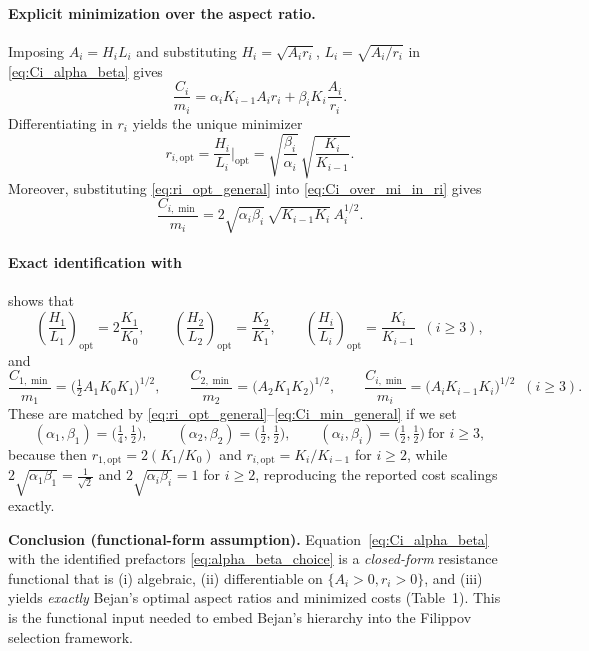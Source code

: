 \documentclass[12pt]{article}
\theoremstyle{plain}
\theoremstyle{definition}
\theoremstyle{remark}
\newcommand{\opt}{\mathrm{opt}}
\begin{document}
\paragraph{Explicit minimization over the aspect ratio.}
Imposing $A_i=H_iL_i$ and substituting $H_i=\sqrt{A_i r_i}$,
$L_i=\sqrt{A_i/r_i}$ in \eqref{eq:Ci_alpha_beta} gives
\begin{equation}
\frac{C_i}{m_i}
=
\alpha_i K_{i-1} A_i r_i
+
\beta_i K_i \frac{A_i}{r_i}.
\label{eq:Ci_over_mi_in_ri}
\end{equation}
Differentiating in $r_i$ yields the unique minimizer
\begin{equation}
r_{i,\opt}
=
\frac{H_i}{L_i}\Big|_{\opt}
=
\sqrt{\frac{\beta_i}{\alpha_i}}\,
\sqrt{\frac{K_i}{K_{i-1}}}.
\label{eq:ri_opt_general}
\end{equation}
Moreover, substituting \eqref{eq:ri_opt_general} into \eqref{eq:Ci_over_mi_in_ri}
gives
\begin{equation}
\frac{C_{i,\min}}{m_i}
=
2\sqrt{\alpha_i\beta_i}\,\sqrt{K_{i-1}K_i}\,A_i^{1/2}.
\label{eq:Ci_min_general}
\end{equation}

\paragraph{Exact identification with \cite{BejanBadescuDeVos2000ECM}} shows that 
\[
\left(\frac{H_1}{L_1}\right)_{\opt}=2\frac{K_1}{K_0},
\qquad
\left(\frac{H_2}{L_2}\right)_{\opt}=\frac{K_2}{K_1},
\qquad
\left(\frac{H_i}{L_i}\right)_{\opt}=\frac{K_i}{K_{i-1}}\;\;(i\ge 3),
\]
and
\[
\frac{C_{1,\min}}{m_1}=\Big(\tfrac12 A_1 K_0K_1\Big)^{1/2},\qquad
\frac{C_{2,\min}}{m_2}=\Big(A_2 K_1K_2\Big)^{1/2},\qquad
\frac{C_{i,\min}}{m_i}=\Big(A_i K_{i-1}K_i\Big)^{1/2}\;\;(i\ge 3).
\]
These are matched by \eqref{eq:ri_opt_general}--\eqref{eq:Ci_min_general} if we set
\begin{equation}
(\alpha_1,\beta_1)=\Big(\tfrac14,\tfrac12\Big),\qquad
(\alpha_2,\beta_2)=\Big(\tfrac12,\tfrac12\Big),\qquad
(\alpha_i,\beta_i)=\Big(\tfrac12,\tfrac12\Big)\ \text{for } i\ge 3,
\label{eq:alpha_beta_choice}
\end{equation}
because then
$r_{1,\opt}=2(K_1/K_0)$ and $r_{i,\opt}=K_i/K_{i-1}$ for $i\ge2$, while
$2\sqrt{\alpha_1\beta_1}=\tfrac{1}{\sqrt2}$ and $2\sqrt{\alpha_i\beta_i}=1$
for $i\ge2$, reproducing the reported cost scalings exactly.

\medskip
\noindent
\textbf{Conclusion (functional-form assumption).}
Equation~\eqref{eq:Ci_alpha_beta} with the identified prefactors
\eqref{eq:alpha_beta_choice} is a \emph{closed-form} resistance functional
that is (i) algebraic, (ii) differentiable on $\{A_i>0,r_i>0\}$, and
(iii) yields \emph{exactly} Bejan’s optimal aspect ratios and minimized
costs (Table~1). This is the functional input needed to embed Bejan’s
hierarchy into the Filippov selection framework.
\end{document}

